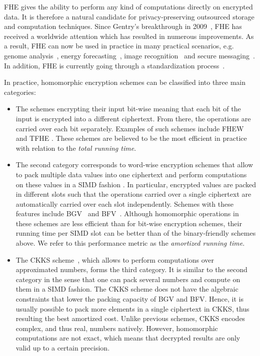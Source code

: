 \ac{FHE} gives the ability to perform any kind of computations directly on encrypted data. 
It is therefore a natural candidate for privacy-preserving outsourced storage and computation techniques. 
Since Gentry's breakthrough in 2009~\cite{STOC:Gentry09}, FHE has received a worldwide attention which has resulted in numerous improvements. 
As a result, \ac{FHE} can now be used in practice in many practical scenarios, e.g. genome analysis~\cite{KL15}, energy forecasting~\cite{BCIV17}, image recognition~\cite{BMMP18} and secure messaging~\cite{SP:ACLS18}. 
In addition, FHE is currently going through a standardization process~\cite{HomomorphicEncryptionSecurityStandard}.
  
In practice, homomorphic encryption schemes can be classified into three main categories:
\begin{itemize}
	\item The schemes encrypting their input bit-wise meaning that each bit of the input is encrypted into a different ciphertext. 
	From there, the operations are carried over each bit separately. 
	Examples of such schemes include FHEW \cite{DM15} and TFHE \cite{CGGI16}. 
	These schemes are believed to be the most efficient in practice with relation to the \emph{total running time}.
	\item The second category corresponds to word-wise encryption schemes that allow to pack multiple data values into one ciphertext and perform computations on these values in a \ac{SIMD} fashion \cite{SV14}. 
	In particular, encrypted values are packed in different slots such that the operations carried over a single ciphertext are automatically carried over each slot independently. 
	Schemes with these features include BGV~\cite{BGV12} and BFV~\cite{C:Brakerski12,FV12}. 
	Although homomorphic operations in these schemes are less efficient than for bit-wise encryption schemes, their running time per SIMD slot can be better than of the binary-friendly schemes above. 
	We refer to this performance metric as the \emph{amortized running time}.
	\item The CKKS scheme~\cite{CKKS17}, which allows to perform computations over approximated numbers, forms the third category. 
	It is similar to the second category in the sense that one can pack several numbers and compute on them in a SIMD fashion.
	The CKKS scheme does not have the algebraic constraints that lower the packing capacity of BGV and BFV. 
	Hence, it is usually possible to pack more elements in a single ciphertext in CKKS, thus resulting the best amortized cost. 
	Unlike previous schemes, CKKS encodes complex, and thus real, numbers natively. 
	However, homomorphic computations are not exact, which means that decrypted results are only valid up to a certain precision. 
\end{itemize}

